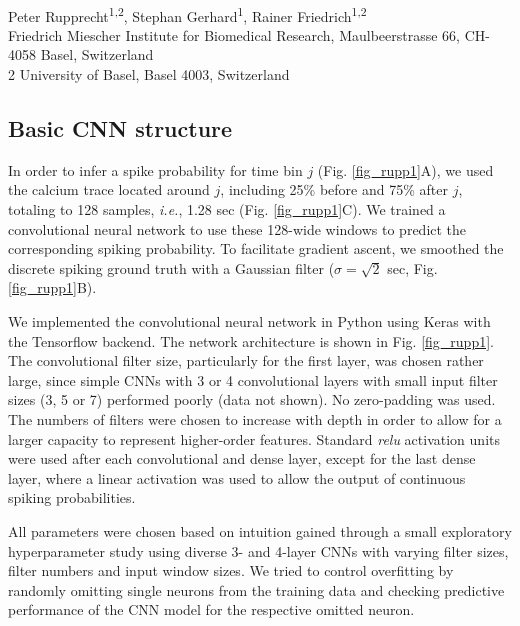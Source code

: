 \documentclass[10pt,letterpaper]{article}
\begin{document}
\begin{flushleft}
{\Large
\textbf{}
}
\newline
\\
Peter Rupprecht\textsuperscript{1,2},
Stephan Gerhard\textsuperscript{1},
Rainer Friedrich\textsuperscript{1,2}
\\
 Friedrich Miescher Institute for Biomedical Research, Maulbeerstrasse 66, CH-4058 Basel, Switzerland
\\
2 University of Basel, Basel 4003, Switzerland
\\

\end{flushleft}

\subsection*{Basic CNN structure}

In order to infer a spike probability for time bin $j$ (Fig. \ref{fig_rupp1}A), we used the calcium trace located around $j$, including 25\% before and 75\% after $j$, totaling to 128 samples, \textit{i.e.}, 1.28 sec (Fig. \ref{fig_rupp1}C). We trained a convolutional neural network to use these 128-wide windows to predict the corresponding spiking probability. To facilitate gradient ascent, we smoothed the discrete spiking ground truth with a Gaussian filter ($\sigma = \sqrt 2$ sec, Fig. \ref{fig_rupp1}B).

We implemented the convolutional neural network in Python using Keras\cite{chollet2015keras} with the Tensorflow\cite{tensorflow2015-whitepaper} backend. The network architecture is shown in Fig. \ref{fig_rupp1}. The convolutional filter size, particularly for the first layer, was chosen rather large, since simple CNNs with 3 or 4 convolutional layers with small input filter sizes (3, 5 or 7) performed poorly (data not shown). No zero-padding was used. The numbers of filters were chosen to increase with depth in order to allow for a larger capacity to represent higher-order features. Standard \textit{relu} activation units were used after each convolutional and dense layer, except for the last dense layer, where a linear activation was used to allow the output of continuous spiking probabilities.

All parameters were chosen based on intuition gained through a small exploratory hyperparameter study using diverse 3- and 4-layer CNNs with varying filter sizes, filter numbers and input window sizes. We tried to control overfitting by randomly omitting single neurons from the training data and checking predictive performance of the CNN model for the respective omitted neuron.
\end{document}
